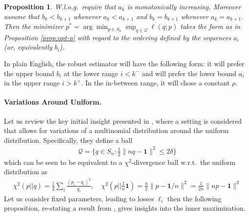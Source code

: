 \documentclass{article}
\newtheorem{proposition}{Proposition}
\begin{document}
\begin{proposition}
W.l.o.g.~require that $a_k$ is monotonically increasing. Moreover assume that $b_k < b_{k+1}$ whenever $a_k < a_{k+1}$ and $b_k = b_{k+1}$ whenever $a_k = a_{k+1}$. Then the minimizer $p^* = \arg\min_{p \in S_n} \sup_{q \in \mathcal Q} \ell(q;p)$ takes the form as in Proposition \ref{prop:opt-p} with regard to the ordering defined by the sequences $a_i$ (or, equivalently $b_i$). 
\end{proposition}

In plain English, the robust estimator will have the following form: it will prefer the upper bound $b_i$ at the lower range $i<k^-$ and will prefer the lower bound $a_i$ in the upper range $i>k^+$. In the in-between range, it will chose a constant $\rho$. 

\paragraph{Variations Around Uniform.}

Let us review the key initial insight presented in \cite{namkoong2017variance}, where a setting is considered that allows for variations of a multinomial distribution around the uniform distribution.  Specifically, they define a ball 
\begin{align}
\mathcal Q = \{ q \in S_n:\tfrac 12 \| n q - \mathbf 1\|^2 \le 2\delta \}
\end{align}
which can be seen to be equivalent to a $\chi^2$-divergence ball w.r.t.~the uniform distribution as 
\begin{align}
\chi^2(p||q) = \frac 12 \sum_i \frac{(p_i-q_i)^2}{q_i}, \quad \chi^2(p|| \tfrac 1n \mathbf 1) = \frac{n}{2} \| p - \mathbf 1 /n \|^2
= \frac{1}{2n} \| np - \mathbf 1\|^2
\end{align}
Let us consider fixed parameters, leading to losses $\ell_i$ then the following proposition, re-stating a result from \cite{namkoong2017variance}, gives insights into the inner maximization.
\end{document}
